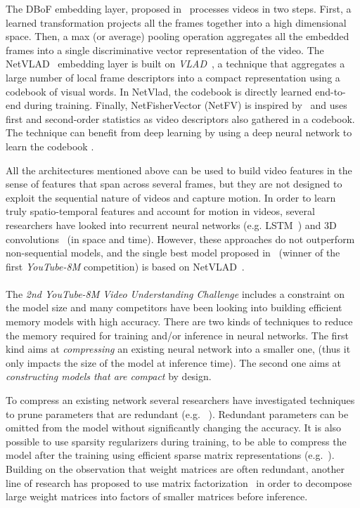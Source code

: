 \documentclass[runningheads]{llncs}
\newcommand{\yt}{\textit{YouTube-8M}\xspace}
\begin{document}
The DBoF embedding layer, proposed in~\cite{45619} processes videos in two steps. 
First, a learned transformation projects all the frames together into a high dimensional space. 
Then, a max (or average) pooling operation aggregates all the embedded frames into a single discriminative vector  representation of the video.  The NetVLAD~\cite{Arandjelovic16} embedding layer is built on {\em VLAD}~\cite{jegou:inria-00548637}, a technique that aggregates a large number of local frame descriptors into a compact representation using a codebook of visual words. In NetVlad, the codebook is directly learned end-to-end during training. Finally, NetFisherVector (NetFV) is inspired by~\cite{4270291} and uses  first and second-order statistics as video descriptors also gathered in a codebook. The technique can benefit from deep learning by using a deep neural network to learn the codebook \cite{DBLP:journals/corr/MiechLS17}.

All the architectures mentioned above can be used to build video features in the sense of features that span across several frames, but they are not designed to exploit the sequential nature of videos and capture motion.  In order to learn truly spatio-temporal features and account for motion in videos, several researchers have looked into recurrent neural networks (e.g. LSTM~\cite{yue2015beyond,DBLP:journals/corr/LiGLBLLLZW17}) and 3D convolutions~\cite{karpathy2014large} (in space and time).
However, these approaches do not  outperform non-sequential models, and  the single best model proposed in~\cite{DBLP:journals/corr/MiechLS17} (winner of the first \yt competition) is based on NetVLAD~\cite{Arandjelovic16}. 

\paragraph{}
The \textit{2nd YouTube-8M Video Understanding Challenge} includes a constraint on the model size and many competitors have been looking into building efficient memory models with high accuracy.
There are two kinds of techniques to reduce the memory required for training and/or inference in neural networks. The first kind aims at \textit{compressing} an existing neural network into a smaller one, (thus it only impacts the size of the model at inference time). The second one aims at {\em constructing models that are compact} by design. 

To compress an existing network several researchers have investigated techniques to prune parameters that are redundant (e.g. ~\cite{pmlr-v80-dai18d,han2015deep_compression,NIPS2017_6813}). Redundant parameters can be omitted from the model without significantly changing the accuracy. It is also possible to use sparsity regularizers during training, to be able to compress the model after the training using efficient sparse matrix representations (e.g.~\cite{Collins2014MemoryBD,pmlr-v80-dai18d,7298681}). Building on the observation that weight matrices are often redundant, another line of research has proposed to use matrix factorization~\cite{NIPS2013_5025,Jaderberg2014SpeedingUC,8099498} in order to decompose large weight matrices into factors of smaller matrices before inference. 
\end{document}
